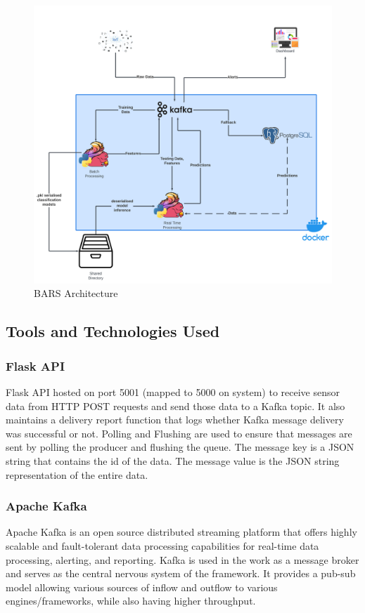 \documentclass[runningheads]{llncs}
\begin{document}
\begin{figure}[htbp]
\centerline{\includegraphics[width=\linewidth]{images/DFD.png}}
\caption{BARS Architecture}
\label{fig:DFD}
\end{figure}

\subsection{Tools and Technologies Used}
\subsubsection{Flask API}
Flask API hosted on port 5001 (mapped to 5000 on system) to receive sensor data from HTTP POST requests and send those data to a Kafka topic. It also maintains a delivery report function that logs whether Kafka message delivery was successful or not. Polling and Flushing are used to ensure that messages are sent by polling the producer and flushing the queue. The message key is a JSON string that contains the id of the data. The message value is the JSON string representation of the entire data.

\subsubsection{Apache Kafka}
Apache Kafka is an open source distributed streaming platform that offers highly scalable and fault-tolerant data processing capabilities for real-time data processing, alerting, and reporting. \cite{b12}
Kafka is used in the work as a message broker and serves as the central nervous system of the framework. It provides a pub-sub model allowing various sources of inflow and outflow to various engines/frameworks, while also having higher throughput. \cite{b13}
\end{document}
